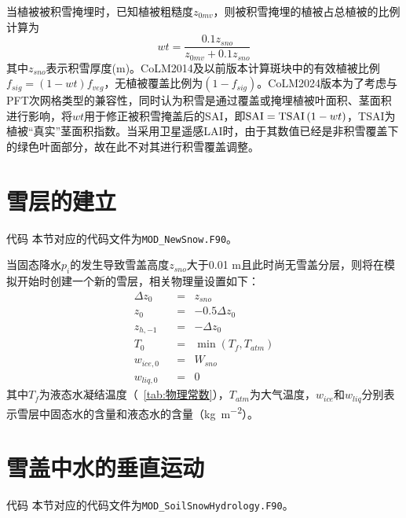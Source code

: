 当植被被积雪掩埋时，已知植被粗糙度$z_{0mv}$，则被积雪掩埋的植被占总植被的比例计算为
\begin{equation}
wt=\frac{0.1 z_{{sno}}}{z_{0mv}+0.1 z_{{sno}}}
\end{equation}
其中$z_{sno}$表示积雪厚度(m)。CoLM2014及以前版本计算斑块中的有效植被比例$f_{sig}=\left(1-wt\right)f_{veg}$，无植被覆盖比例为$\left(1-f_{sig}\right)$。CoLM2024版本为了考虑与PFT次网格类型的兼容性，同时认为积雪是通过覆盖或掩埋植被叶面积、茎面积进行影响，将$wt$用于修正被积雪掩盖后的SAI，即${\rm SAI=TSAI}\left(1-wt\right)$，TSAI为植被“真实”茎面积指数。当采用卫星遥感LAI时，由于其数值已经是非积雪覆盖下的绿色叶面部分，故在此不对其进行积雪覆盖调整。


\section{雪层的建立}\label{sec:雪层的建立}
\begin{mymdframed}{代码}
本节对应的代码文件为\texttt{MOD\_NewSnow.F90}。
\end{mymdframed}


当固态降水$p_{i}$的发生导致雪盖高度$z_{sno}$大于0.01 m且此时尚无雪盖分层，则将在模拟开始时创建一个新的雪层，相关物理量设置如下：
\begin{equation}
\begin{aligned}
& \Delta z_{0} &&= &{z}_{sno}& \\
& z_0 &&= &-0.5\Delta z_0& \\
& z_{h,-1} &&= &-\Delta z_0& \\
& T_0 &&= &\min \left(T_f,T_{atm}\right)& \\
& w_{ice,0} &&= &W_{sno}& \\
& w_{liq,0} &&= &0&
\end{aligned}
\end{equation}
其中$T_f$为液态水凝结温度（~\ref{tab:物理常数}），$T_{atm}$为大气温度，$w_{ice}$和$w_{liq}$分别表示雪层中固态水的含量和液态水的含量（\unit{kg.m^{-2}}）。

\section{雪盖中水的垂直运动}\label{雪盖的水量平衡}
\begin{mymdframed}{代码}
本节对应的代码文件为\texttt{MOD\_SoilSnowHydrology.F90}。
\end{mymdframed}

